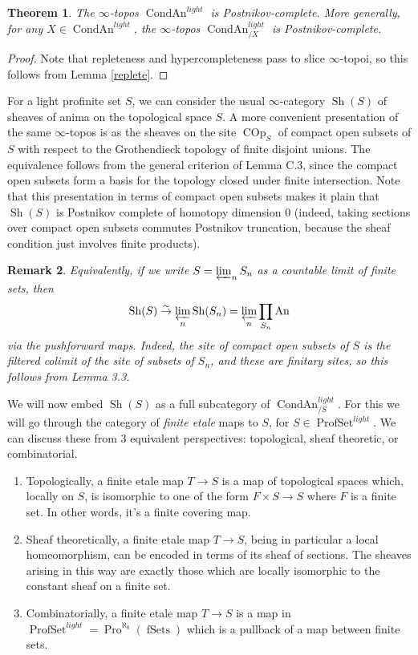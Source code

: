 \documentclass[12pt]{article}
\newtheorem{theorem}{Theorem}[section]
\newtheorem{remark}[theorem]{Remark}
\newcommand{\on}{\operatorname}
\begin{document}
\begin{theorem}
The $\infty$-topos $\on{CondAn}^{light}$ is Postnikov-complete.  More generally, for any $X\in\on{CondAn}^{light}$, the $\infty$-topos $\on{CondAn}^{light}_{/X}$ is Postnikov-complete.
\end{theorem}
\begin{proof}
Note that repleteness and hypercompleteness pass to slice $\infty$-topoi, so this follows from Lemma \ref{replete}.
\end{proof}

For a light profinite set $S$, we can consider the usual $\infty$-category $\on{Sh}(S)$ of sheaves of anima on the topological space $S$.  A more convenient presentation of the same $\infty$-topos is as the sheaves on the site $\on{COp}_S$ of compact open subsets of $S$ with respect to the Grothendieck topology of finite disjoint unions.  The equivalence follows from the general criterion of \cite{HoyoisLefschetz} Lemma C.3, since the compact open subsets form a basis for the topology closed under finite intersection.  Note that this presentation in terms of compact open subsets makes it plain that $\on{Sh}(S)$ is Postnikov complete of homotopy dimension $0$ (indeed, taking sections over compact open subsets commutes Postnikov truncation, because the sheaf condition just involves finite products).

\begin{remark}
Equivalently, if we write $S=\varprojlim_n S_n$ as a countable limit of finite sets, then
$$\on{Sh}(S)\overset{\sim}{\rightarrow}\varprojlim_n \on{Sh}(S_n)=\varprojlim_n \prod_{S_n} \on{An}$$
via the pushforward maps.  Indeed, the site of compact open subsets of $S$ is the filtered colimit of the site of subsets of $S_n$, and these are finitary sites, so this follows from \cite{ClausenHyper} Lemma 3.3.
\end{remark}

We will now embed $\on{Sh}(S)$ as a full subcategory of $\on{CondAn}^{light}_{/S}$.  For this we will go through the category of \emph{finite etale} maps to $S$, for $S\in\on{ProfSet}^{light}$.  We can discuss these from 3 equivalent perspectives: topological, sheaf theoretic, or combinatorial.
\begin{enumerate}
\item Topologically, a finite etale map $T\rightarrow S$ is a map of topological spaces which, locally on $S$, is isomorphic to one of the form $F\times S\rightarrow S$ where $F$ is a finite set.  In other words, it's a finite covering map.
\item Sheaf theoretically, a finite etale map $T\rightarrow S$, being in particular a local homeomorphism, can be encoded in terms of its sheaf of sections.  The sheaves arising in this way are exactly those which are locally isomorphic to the constant sheaf on a finite set.
\item Combinatorially, a finite etale map $T\rightarrow S$ is a map in $\on{ProfSet}^{light}=\on{Pro}^{\aleph_0}(\on{fSets})$ which is a pullback of a map between finite sets.
\end{enumerate}
\end{document}
